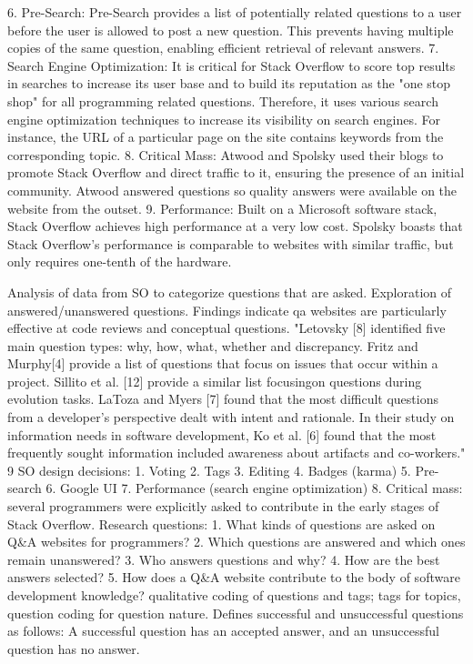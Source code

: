 6.	Pre-Search: Pre-Search provides a list of potentially related questions to a user before the user is allowed to post a new question. This prevents having multiple copies of the same question, enabling efficient retrieval of relevant answers. 
7.	Search Engine Optimization: It is critical for Stack Overflow to score top results in searches to increase its user base and to build its reputation as the "one stop shop" for all programming related questions. Therefore, it uses various search engine optimization techniques to increase its visibility on search engines. For instance, the URL of a particular page on the site contains keywords from the corresponding topic.
8.	Critical Mass: Atwood and Spolsky used their blogs to promote Stack Overflow and direct traffic to it, ensuring the presence of an initial community. Atwood answered questions so quality answers were available on the website from the outset. 
9.	Performance: Built on a Microsoft software stack, Stack Overflow achieves high performance at a very low cost. Spolsky boasts that Stack Overflow's performance is comparable to websites with similar traffic, but only requires one-tenth of the hardware.
\cite{Sewak2010}

Analysis of data from SO to categorize questions that are asked. Exploration of answered/unanswered questions. Findings indicate qa websites are particularly effective at code reviews and conceptual questions.
"Letovsky [8] identified five main question types: why, how, what, whether and discrepancy. Fritz and Murphy[4] provide a list of questions that focus on issues that occur within a project. Sillito et al. [12] provide a similar list focusingon questions during evolution tasks. LaToza and Myers [7] found that the most difficult questions from a developer's perspective dealt with intent and rationale. In their study on information needs in software development, Ko et al. [6] found that the most frequently sought information included awareness about artifacts and co-workers."
9 SO design decisions:
1.	Voting
2.	Tags
3.	Editing
4.	Badges (karma)
5.	Pre-search
6.	Google UI
7.	Performance (search engine optimization)
8.	Critical mass: several programmers were explicitly asked to contribute in the early stages of Stack Overflow.
Research questions:
1.	What kinds of questions are asked on Q\&A websites for programmers?
2.	Which questions are answered and which ones remain unanswered?
3.	Who answers questions and why?
4.	How are the best answers selected?
5.	How does a Q\&A website contribute to the body of software development knowledge?
qualitative coding of questions and tags; tags for topics, question coding for question nature. Defines successful and unsuccessful questions as follows: A successful question has an accepted answer, and an unsuccessful question has no answer.
\cite{Treude2011}

